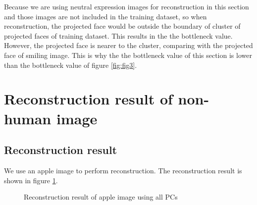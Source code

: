 \documentclass{article}
\begin{document}
Because we are using neutral expression images for reconstruction in this section and those images are not included
in the training dataset, so when reconstruction, the projected face would be outside the boundary of cluster of
projected faces of training dataset. This results in the the bottleneck value. However, the projected face is
nearer to the cluster, comparing with the projected face of smiling image. This is why the the bottleneck value
of this section is lower than the bottleneck value of figure \ref{fig:fig3}.

\section{Reconstruction result of non-human image}

\subsection{Reconstruction result}
We use an apple image to perform reconstruction. The reconstruction result is shown in figure \ref{fig:subfigureExample}.
\begin{figure}[ht]
  \centering
    \caption[Reconstruction result of apple image]{Reconstruction result of apple image using all PCs}
    \label{fig:subfigureExample}
  \end{figure}
\end{document}
